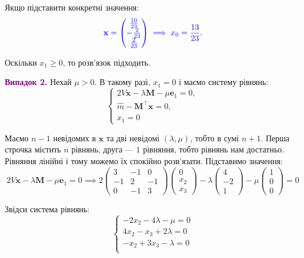 \documentclass{test_template}
\begin{document}
Якщо підставити конкретні значення:
\begin{equation*}
    \textcolor{blue}{\mathbf{x} = \begin{pmatrix}
        \frac{10}{23} \\ -\frac{2}{23} \\ \frac{2}{23}
    \end{pmatrix} \implies x_0 = \frac{13}{23}}.
\end{equation*}

Оскільки $x_1 \geq 0$, то розв'язок підходить.

\textcolor{purple}{\textbf{Випадок 2.}} Нехай $\mu>0$. В такому разі, $x_1=0$ і маємо 
систему рівнянь:
\begin{equation*}
    \begin{cases}
        2V\mathbf{x} - \lambda\mathbf{M} - \mu\mathbf{e}_1 = 0, \\
        \hat{m}- \mathbf{M}^{\top}\mathbf{x} = 0, \\
        x_1 = 0
    \end{cases}
\end{equation*}

Маємо $n-1$ невідомих в $\mathbf{x}$ та дві невідомі $(\lambda,\mu)$, тобто в сумі $n+1$.
Перша строчка містить $n$ рівнянь, друга --- $1$ рівняння, тобто рівнянь нам достатньо. 
Рівняння лінійні і тому можемо їх спокійно розв'язати. Підставимо значення:
\begin{equation*}
    2V\mathbf{x} - \lambda\mathbf{M} - \mu\mathbf{e}_1 = 0 \implies
    2\begin{pmatrix}
        3 & -1 & 0 \\
        -1 & 2 & -1 \\
        0 & -1 & 3
    \end{pmatrix}\begin{pmatrix}
        0 \\ x_2 \\ x_3
    \end{pmatrix} - \lambda\begin{pmatrix}
        4 \\ -2 \\ 1
    \end{pmatrix} - \mu\begin{pmatrix}
        1 \\ 0 \\ 0
    \end{pmatrix} = 0
\end{equation*}

Звідси система рівнянь:
\begin{equation*}
    \begin{cases}
        -2x_2 - 4\lambda - \mu = 0 \\
        4x_2 - x_3 + 2\lambda = 0 \\
        -x_2 + 3x_3 - \lambda = 0 \\
    \end{cases}
\end{equation*}
\end{document}

